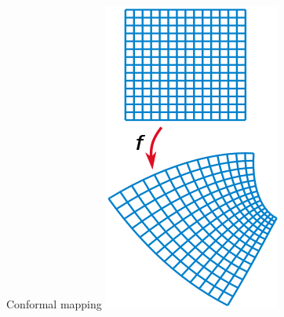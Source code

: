 \documentclass{sintefbeamer}
\renewcommand{\_}[1]{_\mr{#1}}
\begin{document}
\begin{frame}{Conformal mapping}
\centering
	\includegraphics[width=.22\framewidth]{220px-Conformal_map.svg.png}
	\hspace{2cm}

\end{frame}
\end{document}
